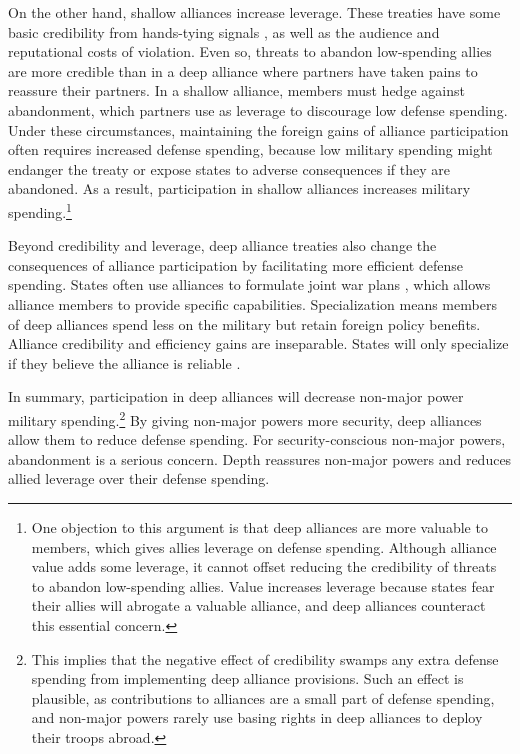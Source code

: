 \documentclass[12pt]{article}
\begin{document}
On the other hand, shallow alliances increase leverage. 
These treaties have some basic credibility from hands-tying signals \citep{Fearon1997}, as well as the audience \cite{Morrow2000} and reputational \citep{Gibler2008, Crescenzietal2012} costs of violation.
Even so, threats to abandon low-spending allies are more credible than in a deep alliance where partners have taken pains to reassure their partners.  
In a shallow alliance, members must hedge against abandonment, which partners use as leverage to discourage low defense spending. 
Under these circumstances, maintaining the foreign gains of alliance participation often requires increased defense spending, because low military spending might endanger the treaty or expose states to adverse consequences if they are abandoned. 
As a result, participation in shallow alliances increases military spending.\footnote{
One objection to this argument is that deep alliances are more valuable to members, which gives allies leverage on defense spending. 
Although alliance value adds some leverage, it cannot offset reducing the credibility of threats to abandon low-spending allies.
Value increases leverage because states fear their allies will abrogate a valuable alliance, and deep alliances counteract this essential concern. 
}


Beyond credibility and leverage, deep alliance treaties also change the consequences of alliance participation by facilitating more efficient defense spending. 
States often use alliances to formulate joint war plans \citep{Poast2019a}, which allows alliance members to provide specific capabilities. 
Specialization means members of deep alliances spend less on the military but retain foreign policy benefits.
Alliance credibility and efficiency gains are inseparable. 
States will only specialize if they believe the alliance is reliable \citep{Leeds2003a}.  


In summary, participation in deep alliances will decrease non-major power military spending.\footnote{This implies that the negative effect of credibility swamps any extra defense spending from implementing deep alliance provisions. Such an effect is plausible, as contributions to alliances are a small part of defense spending, and non-major powers rarely use basing rights in deep alliances to deploy their troops abroad.} 
By giving non-major powers more security, deep alliances allow them to reduce defense spending. 
For security-conscious non-major powers, abandonment is a serious concern. 
Depth reassures non-major powers and reduces allied leverage over their defense spending. 
\end{document}
